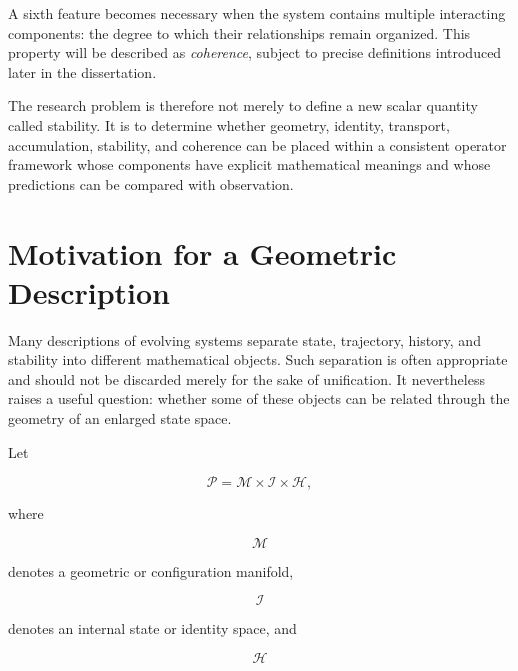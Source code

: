 \documentclass[12pt,oneside]{book}
\begin{document}
A sixth feature becomes necessary when the system contains
multiple interacting components: the degree to which their
relationships remain organized. This property will be described
as \emph{coherence}, subject to precise definitions introduced
later in the dissertation.

The research problem is therefore not merely to define a new
scalar quantity called stability. It is to determine whether
geometry, identity, transport, accumulation, stability, and
coherence can be placed within a consistent operator framework
whose components have explicit mathematical meanings and whose
predictions can be compared with observation.


\section{Motivation for a Geometric Description}
\label{sec:geometric-motivation}

Many descriptions of evolving systems separate state,
trajectory, history, and stability into different mathematical
objects. Such separation is often appropriate and should not be
discarded merely for the sake of unification. It nevertheless
raises a useful question: whether some of these objects can be
related through the geometry of an enlarged state space.

Let

\begin{equation}
    \mathcal{P}
    =
    \mathcal{M}
    \times
    \mathcal{I}
    \times
    \mathcal{H},
    \label{eq:product-state-space}
\end{equation}

where

\begin{equation}
    \mathcal{M}
\end{equation}

denotes a geometric or configuration manifold,

\begin{equation}
    \mathcal{I}
\end{equation}

denotes an internal state or identity space, and

\begin{equation}
    \mathcal{H}
\end{equation}
\end{document}
